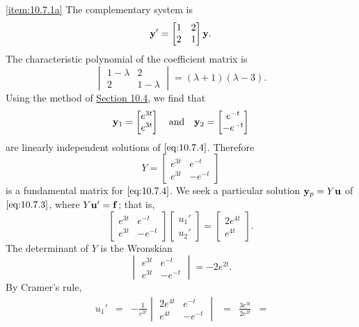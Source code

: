 \documentclass{ximera}
\begin{document}
\begin{example}
\begin{explanation}
\ref{item:10.7.1a} The complementary system is
\begin{equation} \label{eq:10.7.4}
{\bf y}'=\begin{bmatrix}1&2\\2&1\end{bmatrix}{\bf y}.
\end{equation}
The characteristic polynomial of the coefficient matrix is
$$
\begin{vmatrix}1-\lambda&2\\2&1-\lambda\end{vmatrix}=
(\lambda+1)(\lambda-3).
$$
Using the method of \href{https://xerxes.ximera.org/differentialequations/main/constCoeffHomSysI/constCoeffHomSysI}{Section 10.4}, we find that
$$
{\bf y}_1=\begin{bmatrix}e^{3t}\\e^{3t}\end{bmatrix}
\quad\mbox{and}\quad
{\bf y}_2=\begin{bmatrix}e^{-t}\\-e^{-t}\end{bmatrix}
$$
are linearly independent solutions of $\eqref{eq:10.7.4}$.
Therefore
$$
Y=\begin{bmatrix}e^{3t}&e^{-t}\\e^{3t}&-e^{-t}\end{bmatrix}
$$
is a fundamental matrix for $\eqref{eq:10.7.4}$. We seek a particular
solution ${\bf y}_p=Y{\bf u}$ of $\eqref{eq:10.7.3}$, where $Y{\bf u}'={\bf f}$; that is,
$$
\begin{bmatrix}e^{3t}&e^{-t}\\e^{3t}&-e^{-t}\end{bmatrix}
\begin{bmatrix}u_1'\\u_2'\end{bmatrix}
=\begin{bmatrix}2e^{4t}\\e^{4t}\end{bmatrix}.
$$
The determinant of $Y$ is the Wronskian
$$
\begin{vmatrix}e^{3t}&e^{-t}\\e^{3t}&-e^{-t}\end{vmatrix}
=-2e^{2t}.
$$
By Cramer's rule,
$$
\begin{array}{ccccccl}
u_1'&=&-\frac{1}{e^{2t}}
\begin{vmatrix}2e^{4t}&e^{-t}\\e^{4t}&-e^{-t}
\end{vmatrix}&=&\frac{3e^{3t}}{2e^{2t}}&=

\end{array}$$
\end{explanation}
\end{example}
\end{document}
